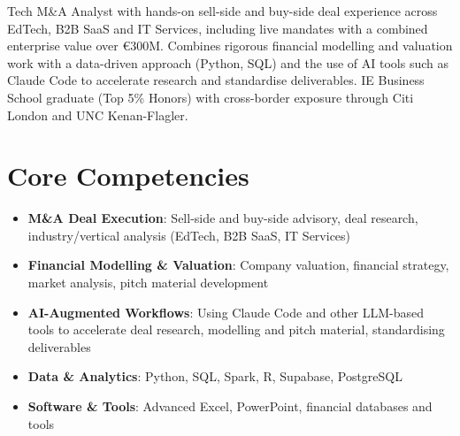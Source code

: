 \documentclass[11pt,a4paper,sans]{moderncv}
\begin{document}
\makecvtitle


\vspace{6pt}
\small{Tech M\&A Analyst with hands-on sell-side and buy-side deal experience across EdTech, B2B SaaS and IT Services, including live mandates with a combined enterprise value over €300M. Combines rigorous financial modelling and valuation work with a data-driven approach (Python, SQL) and the use of AI tools such as Claude Code to accelerate research and standardise deliverables. IE Business School graduate (Top 5\% Honors) with cross-border exposure through Citi London and UNC Kenan-Flagler.}


\section{Core Competencies}
\vspace{1pt}
\begin{itemize}

\item \textbf{M\&A Deal Execution}: Sell-side and buy-side advisory, deal research, industry/vertical analysis (EdTech, B2B SaaS, IT Services)

\item \textbf{Financial Modelling \& Valuation}: Company valuation, financial strategy, market analysis, pitch material development

\item \textbf{AI-Augmented Workflows}: Using Claude Code and other LLM-based tools to accelerate deal research, modelling and pitch material, standardising deliverables

\item \textbf{Data \& Analytics}: Python, SQL, Spark, R, Supabase, PostgreSQL

\item \textbf{Software \& Tools}: Advanced Excel, PowerPoint, financial databases and tools

\end{itemize}

\end{document}
